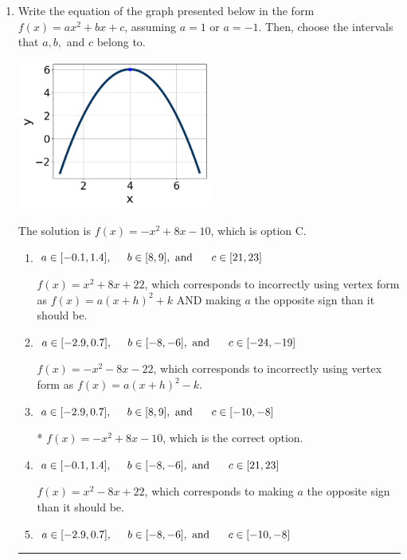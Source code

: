 \documentclass{extbook}[14pt]
\newcommand{\litem}[1]{\item #1

\rule{\textwidth}{0.4pt}}
\begin{document}
\begin{enumerate}\litem{
Write the equation of the graph presented below in the form $f(x)=ax^2+bx+c$, assuming  $a=1$ or $a=-1$. Then, choose the intervals that $a, b,$ and $c$ belong to.

\begin{center}
    \includegraphics[width=0.5\textwidth]{../Figures/quadraticGraphToEquationCopyB.png}
\end{center}



The solution is \( f(x) = -x^{2} +8 x -10 \), which is option C.\begin{enumerate}[label=\Alph*.]
\item \( a \in [-0.1, 1.4], \hspace*{5mm} b \in [8, 9], \text{ and } \hspace*{5mm} c \in [21, 23] \)

$f(x)=x^{2} +8 x + 22$, which corresponds to incorrectly using vertex form as $f(x) = a(x+h)^2+k$ AND making $a$ the opposite sign than it should be.
\item \( a \in [-2.9, 0.7], \hspace*{5mm} b \in [-8, -6], \text{ and } \hspace*{5mm} c \in [-24, -19] \)

$f(x)=-x^{2} -8 x -22$, which corresponds to incorrectly using vertex form as $f(x) = a(x+h)^2 - k$.
\item \( a \in [-2.9, 0.7], \hspace*{5mm} b \in [8, 9], \text{ and } \hspace*{5mm} c \in [-10, -8] \)

* $f(x)=-x^{2} +8 x -10$, which is the correct option.
\item \( a \in [-0.1, 1.4], \hspace*{5mm} b \in [-8, -6], \text{ and } \hspace*{5mm} c \in [21, 23] \)

$f(x)=x^{2} -8 x + 22$, which corresponds to making $a$ the opposite sign than it should be.
\item \( a \in [-2.9, 0.7], \hspace*{5mm} b \in [-8, -6], \text{ and } \hspace*{5mm} c \in [-10, -8] \)


\end{enumerate}}
\end{enumerate}
\end{document}
